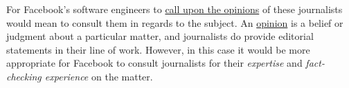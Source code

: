 \par For Facebook's software engineers to \ul{call upon the opinions} of these journalists would mean to consult them in regards to the subject. An \ul{opinion} is a belief or judgment about a particular matter, \cite{dictionary} and journalists do provide editorial statements in their line of work. However, in this case it would be more appropriate for Facebook to consult journalists for their \emph{expertise} and \emph{fact-checking experience} on the matter.

